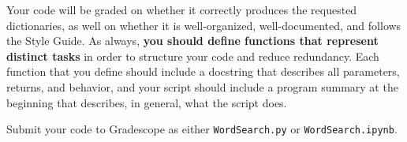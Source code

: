 \documentclass{homework}
\begin{document}
Your code will be graded on whether it correctly produces the requested dictionaries, as well on whether it is well-organized, well-documented, and follows the Style Guide. As always, \textbf{you should define functions that represent distinct tasks} in order to structure your code and reduce redundancy. Each function that you define should include a docstring that describes all parameters, returns, and behavior, and your script should include a program summary at the beginning that describes, in general, what the script does.


Submit your code to Gradescope as either \texttt{WordSearch.py} or \texttt{WordSearch.ipynb}.






\end{document}
